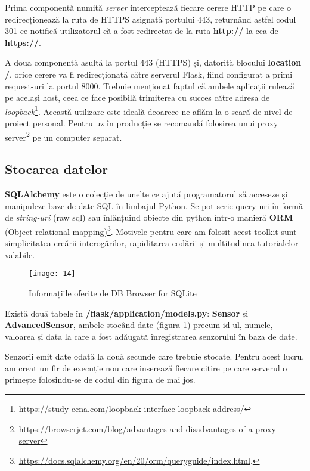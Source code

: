 Prima componentă numită \emph{server} interceptează fiecare cerere HTTP pe care o redirecționează la ruta de HTTPS asignată portului 443, returnând astfel codul 301 ce notifică utilizatorul că a fost redirectat de la ruta \textbf{http://} la cea de \textbf{https://}.

A doua componentă asultă la portul 443 (HTTPS) și, datorită blocului \textbf{location /}, orice cerere va fi redirecționată către serverul Flask, fiind configurat a primi request-uri la portul 8000. Trebuie menționat faptul că ambele aplicații rulează pe același host, ceea ce face posibilă trimiterea cu succes către adresa de \emph{loopback}\footnote{\url{https://study-ccna.com/loopback-interface-loopback-address/}}. Această utilizare este ideală deoarece ne aflăm la o scară de nivel de proiect personal. Pentru uz în producție se recomandă folosirea unui proxy server\footnote{\url{https://browserjet.com/blog/advantages-and-disadvantages-of-a-proxy-server}} pe un computer separat.

\subsection{Stocarea datelor}

\textbf{SQLAlchemy} este o colecție de unelte ce ajută programatorul să acceseze și manipuleze baze de date SQL în limbajul Python. Se pot scrie query-uri în formă de \emph{string-uri} (raw sql) sau înlănțuind obiecte din python într-o manieră \textbf{ORM} (Object relational mapping)\footnote{\url{https://docs.sqlalchemy.org/en/20/orm/queryguide/index.html}.}. Motivele pentru care am folosit acest toolkit sunt simplicitatea creării interogărilor, rapiditarea codării și multitudinea tutorialelor valabile.

\begin{figure}[h]
	\centering
	\texttt{[image: 14]}
	\caption{Informațiile oferite de DB Browser for SQLite}
	\label{fig:14}
\end{figure}

Există două tabele în \textbf{/flask/application/models.py}: \textbf{Sensor} și \textbf{AdvancedSensor}, ambele stocând date (figura \ref{fig:14}) precum id-ul, numele, valoarea și data la care a fost adăugată înregistrarea senzorului în baza de date.

\break

Senzorii emit date odată la două secunde care trebuie stocate. Pentru acest lucru, am creat un fir de execuție nou care inserează fiecare citire pe care serverul o primește folosindu-se de codul din figura de mai jos.

